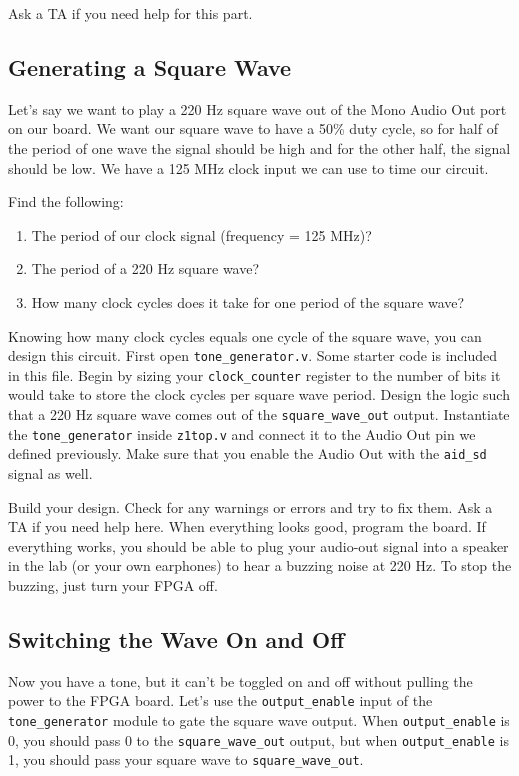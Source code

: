 \documentclass[11pt]{article}
\begin{document}
Ask a TA if you need help for this part.

\subsection{Generating a Square Wave}
Let's say we want to play a 220 Hz square wave out of the Mono Audio Out port on our board. We want our square wave to have a 50\% duty cycle, so for half of the period of one wave the signal should be high and for the other half, the signal should be low. We have a 125 MHz clock input we can use to time our circuit.

Find the following:
\begin{enumerate}
  \item The period of our clock signal (frequency = 125 MHz)?
  \item The period of a 220 Hz square wave?
  \item How many clock cycles does it take for one period of the square wave?
\end{enumerate}

Knowing how many clock cycles equals one cycle of the square wave, you can design this circuit. First open \verb|tone_generator.v|. Some starter code is included in this file. Begin by sizing your \verb|clock_counter| register to the number of bits it would take to store the clock cycles per square wave period. Design the logic such that a 220 Hz square wave comes out of the \verb|square_wave_out| output. Instantiate the \verb|tone_generator| inside \verb|z1top.v| and connect it to the Audio Out pin we defined previously. Make sure that you enable the Audio Out with the \verb|aid_sd| signal as well.

Build your design. Check for any warnings or errors and try to fix them. Ask a TA if you need help here. When everything looks good, program the board. If everything works, you should be able to plug your audio-out signal into a speaker in the lab (or your own earphones) to hear a buzzing noise at 220 Hz. To stop the buzzing, just turn your FPGA off.

\subsection{Switching the Wave On and Off}
Now you have a tone, but it can't be toggled on and off without pulling the power to the FPGA board. Let's use the \verb|output_enable| input of the \verb|tone_generator| module to gate the square wave output. When \verb|output_enable| is 0, you should pass 0 to the \verb|square_wave_out| output, but when \verb|output_enable| is 1, you should pass your square wave to \verb|square_wave_out|.
\end{document}
